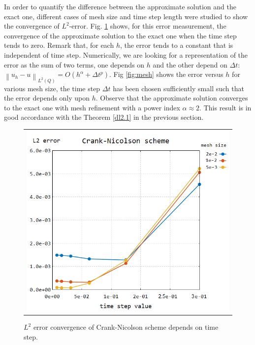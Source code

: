 In order to quantify the difference between the approximate solution and the exact one, different cases of mesh size and time step length were studied to show the convergence of $L^2$-error. Fig. \ref{fig:time} shows, for this error measurement, the convergence of the approximate solution to the exact one when the time step tends to zero. Remark that, for each $h$, the error tends to a constant that is independent of time step. Numerically, we are looking for a representation of the error as the sum of two terms, one depends on $h$ and the other depend on $\Delta t$: $\left\|u_h-u\right\|_{L^2(Q)}=O\left(h^{\alpha}+\Delta t^{p}\right)$. Fig \ref{fig:mesh} shows the error versus $h$ for various mesh size, the time step $\Delta t$ has been chosen sufficiently small such that the error depends only upon $h$. Observe that the approximate solution converges to the exact one with mesh refinement with a power index $\alpha \approx 2$. This result is in good accordance with the Theorem \ref{dl2.1} in the previous section.
\begin{figure}[h!]
	\centering
	\begin{tabular}{c}
		\includegraphics[width=.8\linewidth]{figures/CNt}
	\end{tabular}
	\caption{$L^2$ error convergence of Crank-Nicolson scheme depends on time step.}
	\label{fig:time}
\end{figure}
